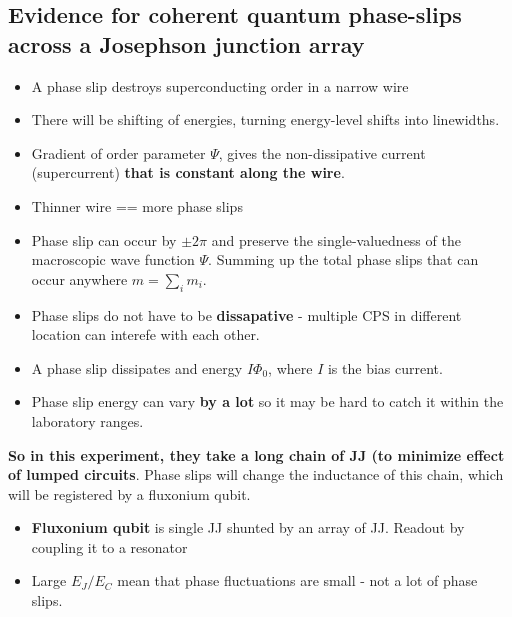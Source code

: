   \subsection{Evidence  for  coherent  quantum phase-slips  across  a  Josephson
    junction array \cite{Manucharyan_2012}}
  \label{sec:evid-coher-quant}

  \begin{framed}\noindent
    \begin{itemize}
    \item A phase slip destroys superconducting order in a narrow wire
    \item There will  be shifting of energies, turning  energy-level shifts into
      linewidths.
    \item Gradient of order parameter  $\Psi$, gives the non-dissipative current
      (supercurrent) \textbf{that is constant along the wire}.
    \item Thinner wire == more phase slips
    \item Phase slip can occur by  $\pm 2\pi$ and preserve the single-valuedness
      of the macroscopic wave function $\Psi$.  Summing up the total phase slips
      that can occur anywhere $m = \sum_im_i $.
    \item Phase slips  do not have to be \textbf{dissapative}  - multiple CPS in
      different location can interefe with each other.
    \item A phase slip dissipates and  energy $I\Phi_{0}$, where $I$ is the bias
      current.
    \item Phase  slip energy can  vary \textbf{by  a lot} so  it may be  hard to
      catch it within the laboratory ranges.
    \end{itemize}

    \begin{framed}\noindent
      \textbf{So in this  experiment, they take a long chain  of JJ (to minimize
        effect of  lumped circuits}. Phase  slips will change the  inductance of
      this chain, which will be registered by a fluxonium qubit.
      \begin{itemize}
      \item  \textbf{Fluxonium  qubit} is  single  JJ  shunted  by an  array  of
        JJ. Readout by coupling it to a resonator
      \item Large $E_{J}/E_C$ mean that phase fluctuations are small - not a lot
        of phase slips.
      \end{itemize}
    \end{framed}
  \end{framed}

